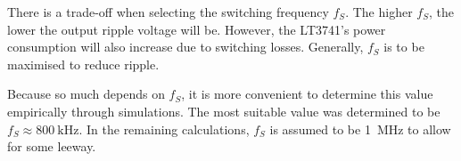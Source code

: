There is a trade-off when  selecting the switching frequency $f_S$. The higher
$f_S$,  the lower  the output  ripple voltage  will be. However,  the LT3741's
power  consumption will  also increase  due to  switching losses.   Generally,
$f_S$ is to be maximised to reduce ripple.

Because so  much depends  on $f_S$,  it is more  convenient to  determine this
value empirically through simulations. The  most suitable value was determined
to be $f_S \approx\SI{800}{\kilo\hertz}$. In the remaining calculations, $f_S$
is assumed to be \SI{1}{\mega\hertz} to allow for some leeway.

